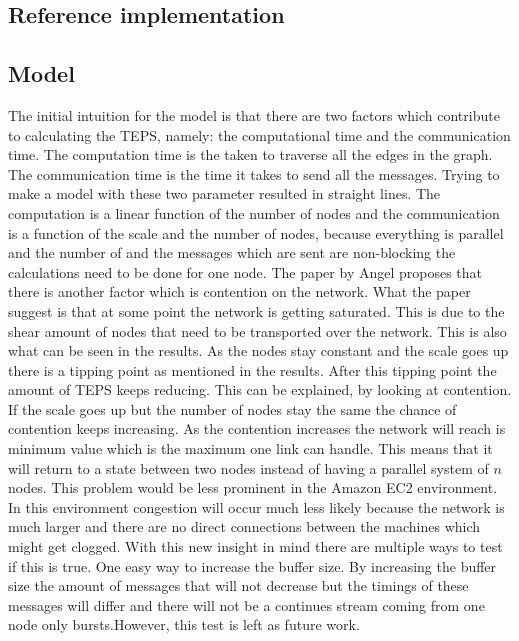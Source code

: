 \subsection{Reference implementation}


\subsection{Model}
The initial intuition for the model is that there are two factors which contribute to calculating the TEPS, namely: the computational time and the communication time. The computation time is the  taken to traverse all the edges in the graph. The communication time is the time it takes to send all the messages. Trying to make a model with these two parameter resulted in straight lines. The computation is a linear function of the number of nodes and the communication is a function of the scale and the number of nodes, because everything is parallel and the number of and the messages which are sent are non-blocking the calculations need to be done for one node.
The paper by Angel proposes that there is another factor which is contention on the network. What the paper suggest is that at some point the network is getting saturated. This is due to the shear amount of nodes that need to be transported over the network. This is also what can be seen in the results. As the nodes stay constant and the scale goes up there is a tipping point as mentioned in the results. After this tipping point the amount of TEPS keeps reducing. This can be explained, by looking at contention. If the scale goes up but the number of nodes stay the same the chance of contention keeps increasing. As the contention increases the network will reach is minimum value which is the maximum one link can handle. This means that it will return to a state between two nodes instead of having a parallel system of $n$ nodes.
This problem would be less prominent in the Amazon EC2 environment. In this environment congestion will occur much less likely because the network is much larger and there are no direct connections between the machines which might get clogged.
With this new insight in mind there are multiple ways to test if this is true. One easy way to increase the buffer size. By increasing the buffer size the amount of messages that will not decrease but the timings of these messages will differ and there will not be a continues stream coming from one node only bursts.However, this test is left as future work. 



 